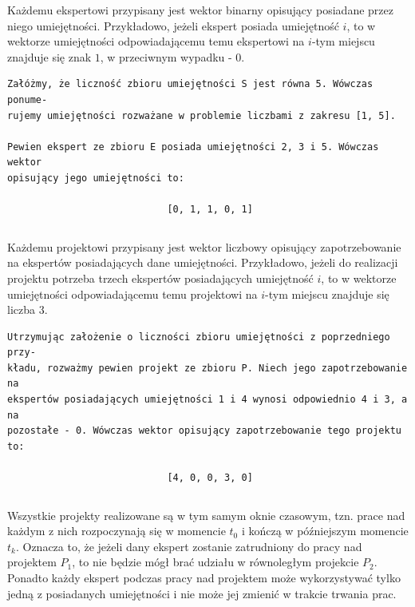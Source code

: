 \documentclass[12pt,a4paper]{article}
\theoremstyle{definition}
\begin{document}
\noindent
Każdemu ekspertowi przypisany jest wektor binarny opisujący posiadane przez niego umiejętności. Przykładowo, jeżeli ekspert posiada umiejętność $i$, to w wektorze umiejętności odpowiadającemu temu ekspertowi na $i$-tym miejscu znajduje się znak $1$, w przeciwnym wypadku - $0$.

\begin{verbatim}
Załóżmy, że liczność zbioru umiejętności S jest równa 5. Wówczas ponume-
rujemy umiejętności rozważane w problemie liczbami z zakresu [1, 5].

Pewien ekspert ze zbioru E posiada umiejętności 2, 3 i 5. Wówczas wektor
opisujący jego umiejętności to:

                            [0, 1, 1, 0, 1]
\end{verbatim}
\begin{lstlisting}[caption={Wektor opisujący umiejętności eksperta}]
\end{lstlisting}

\noindent
Każdemu projektowi przypisany jest wektor liczbowy opisujący zapotrzebowanie na ekspertów posiadających dane umiejętności. Przykładowo, jeżeli do realizacji projektu potrzeba trzech ekspertów posiadających umiejętność $i$, to w wektorze umiejętności odpowiadającemu temu projektowi na $i$-tym miejscu znajduje się liczba $3$.

\begin{verbatim}
Utrzymując założenie o liczności zbioru umiejętności z poprzedniego przy-
kładu, rozważmy pewien projekt ze zbioru P. Niech jego zapotrzebowanie na
ekspertów posiadających umiejętności 1 i 4 wynosi odpowiednio 4 i 3, a na
pozostałe - 0. Wówczas wektor opisujący zapotrzebowanie tego projektu to:
 
                            [4, 0, 0, 3, 0]
\end{verbatim}
\begin{lstlisting}[caption={Wektor opisujący zapotrzebowanie projektu}]
\end{lstlisting}

\noindent
Wszystkie projekty realizowane są w tym samym oknie czasowym, tzn. prace nad każdym z nich rozpoczynają się w momencie $t_0$ i kończą w późniejszym momencie $t_k$. Oznacza to, że jeżeli dany ekspert zostanie zatrudniony do pracy nad projektem $P_1$, to nie będzie mógł brać udziału w równoległym projekcie $P_2$. Ponadto każdy ekspert podczas pracy nad projektem może wykorzystywać tylko jedną z posiadanych umiejętności i nie może jej zmienić w trakcie trwania prac.\\
\end{document}
